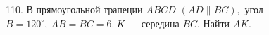 110. В прямоугольной трапеции $ABCD$ $(AD\parallel BC),$ угол $B=120^\circ,\ AB=BC=6.\ K$ --- середина $BC.$ Найти $AK.$\\
